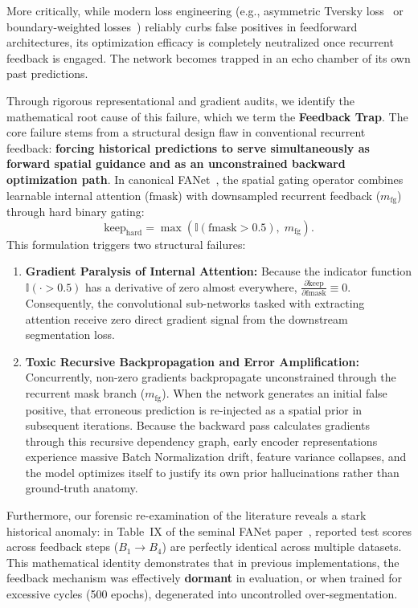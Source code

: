 More critically, while modern loss engineering (e.g., asymmetric Tversky loss~\cite{salehi2017tversky} or boundary-weighted losses~\cite{kervadec2019boundary}) reliably curbs false positives in feedforward architectures, its optimization efficacy is completely neutralized once recurrent feedback is engaged. The network becomes trapped in an echo chamber of its own past predictions. 

Through rigorous representational and gradient audits, we identify the mathematical root cause of this failure, which we term the \textbf{Feedback Trap}. The core failure stems from a structural design flaw in conventional recurrent feedback: \textbf{forcing historical predictions to serve simultaneously as forward spatial guidance and as an unconstrained backward optimization path}. In canonical FANet~\cite{tomar2021fanet}, the spatial gating operator combines learnable internal attention ($\text{fmask}$) with downsampled recurrent feedback ($m_{\text{fg}}$) through hard binary gating:
\begin{equation}
  \label{eq:hard_gate_intro}
  \text{keep}_{\text{hard}} = \max\left(\mathbb{I}(\text{fmask} > 0.5),\; m_{\text{fg}}\right).
\end{equation}
This formulation triggers two structural failures:
\begin{enumerate}
  \item \textbf{Gradient Paralysis of Internal Attention:} Because the indicator function $\mathbb{I}(\cdot > 0.5)$ has a derivative of zero almost everywhere, $\frac{\partial \text{keep}}{\partial \text{fmask}} \equiv 0$. Consequently, the convolutional sub-networks tasked with extracting attention receive zero direct gradient signal from the downstream segmentation loss.
  \item \textbf{Toxic Recursive Backpropagation and Error Amplification:} Concurrently, non-zero gradients backpropagate unconstrained through the recurrent mask branch ($m_{\text{fg}}$). When the network generates an initial false positive, that erroneous prediction is re-injected as a spatial prior in subsequent iterations. Because the backward pass calculates gradients through this recursive dependency graph, early encoder representations experience massive Batch Normalization drift, feature variance collapses, and the model optimizes itself to justify its own prior hallucinations rather than ground-truth anatomy.
\end{enumerate}

Furthermore, our forensic re-examination of the literature reveals a stark historical anomaly: in Table~IX of the seminal FANet paper~\cite{tomar2021fanet}, reported test scores across feedback steps ($B_1 \to B_4$) are perfectly identical across multiple datasets. This mathematical identity demonstrates that in previous implementations, the feedback mechanism was effectively \textbf{dormant} in evaluation, or when trained for excessive cycles (500 epochs), degenerated into uncontrolled over-segmentation.

